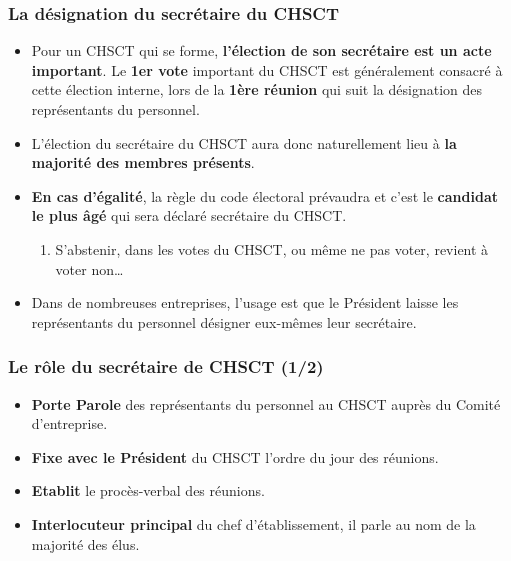 \documentclass{beamer}
\begin{document}
\begin{frame}
\frametitle{La désignation du secrétaire du CHSCT}
\begin{itemize}
\item Pour un CHSCT qui se forme, \textbf{l’élection de son secrétaire est un acte important}. Le \textbf{1er vote} important du CHSCT est généralement consacré à cette élection interne, lors de la \textbf{1ère réunion} qui suit la désignation des représentants du personnel. 

\item L’élection du secrétaire du CHSCT aura donc naturellement lieu à \textbf{la majorité des membres présents}. 

\item \textbf{En cas d’égalité}, la règle du code électoral prévaudra et c’est le \textbf{candidat le plus âgé} qui sera déclaré secrétaire du CHSCT. 
\begin{enumerate}
\item S’abstenir, dans les votes du CHSCT, ou même ne pas voter, revient à voter non…
\end{enumerate}
\item Dans de nombreuses entreprises, l’usage est que le Président laisse les représentants du personnel désigner eux-mêmes leur secrétaire.
\end{itemize}
\end{frame}

\begin{frame}
\frametitle{Le rôle du secrétaire de CHSCT (1/2)}

\begin{itemize}
\item \textbf{Porte Parole} des représentants du personnel au CHSCT auprès du Comité d'entreprise.

\item \textbf{Fixe avec le Président} du CHSCT l'ordre du jour des réunions.

\item \textbf{Etablit} le procès-verbal des réunions.

\item \textbf{Interlocuteur principal} du chef d'établissement, il parle au nom de la majorité des élus.
\end{itemize}
\end{frame}
\end{document}
